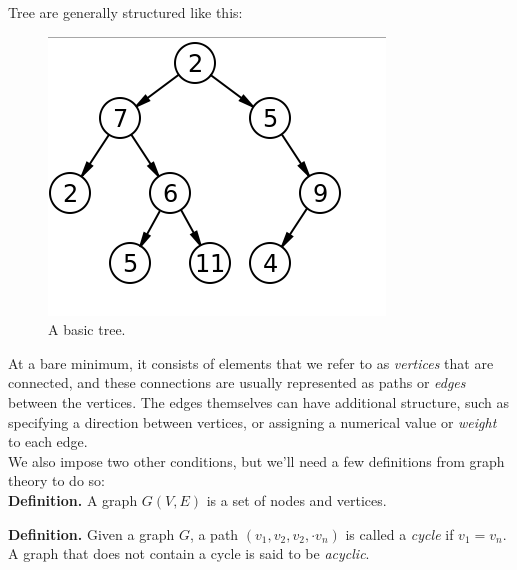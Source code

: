 \documentclass[a4paper,10pt]{report}
\begin{document}
Tree are generally structured like this:
\begin{figure}[h!]
	\begin{centering}
	\begin{center}
	\includegraphics[width=\linewidth]{./basic_tree.png}
	\caption{A basic tree.}
	\label{fig:basic_tree}
	\end{center}
	\par\end{centering}
\end{figure}

At a bare minimum, it consists of elements that we refer to as \textit{vertices} that are connected, and these connections are usually represented as paths or \textit{edges} between the vertices. The edges themselves can have additional structure, such as specifying a direction between vertices, or assigning a numerical value or \textit{weight} to each edge.\\

We also impose two other conditions, but we'll need a few definitions from graph theory to do so:\\

\textbf{Definition.} A graph $G(V,E)$ is a set of nodes and vertices.

\textbf{Definition.} Given a graph $G$, a path $(v_1, v_2, v_2, \cdot v_n)$ is called a \textit{cycle} if $v_1 = v_n$. A graph that does not contain a cycle is said to be \textit{acyclic}.

\hrulefill
\end{document}
